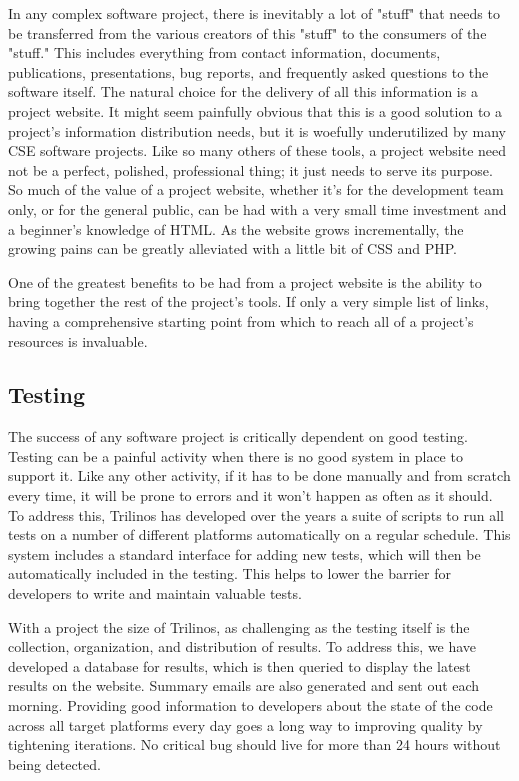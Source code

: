 \documentclass[12pt,relax]{article}
\begin{document}

In any complex software project, there is inevitably a lot of "stuff" that
needs to be transferred from the various creators of this "stuff" to the
consumers of the "stuff."  This includes everything from contact information,
documents, publications, presentations, bug reports, and frequently asked
questions to the software itself.  The natural choice for the delivery of all
this information is a project website.  It might seem painfully obvious that
this is a good solution to a project's information distribution needs, but it
is woefully underutilized by many CSE software projects.  Like so many others
of these tools, a project website need not be a perfect, polished, professional
thing; it just needs to serve its purpose.  So much of the value of a project
website, whether it's for the development team only, or for the general
public, can be had with a very small time investment and a beginner's
knowledge of HTML.  As the website grows incrementally, the growing pains can
be greatly alleviated with a little bit of CSS and PHP.

One of the greatest benefits to be had from a project website is the ability to
bring together the rest of the project's tools.  If only a very simple list of
links, having a comprehensive starting point from which to reach all of a
project's resources is invaluable.

\subsection{Testing}


The success of any software project is critically dependent on good testing.
Testing can be a painful activity when there is no good system in place to
support it.  Like any other activity, if it has to be done manually and from
scratch every time, it will be prone to errors and it won't happen as often as
it should.  To address this, Trilinos has developed over the years a suite of
scripts to run all tests on a number of different platforms automatically on a
regular schedule.  This system includes a standard interface for adding new
tests, which will then be automatically included in the testing.  This helps
to lower the barrier for developers to write and maintain valuable tests.

With a project the size of Trilinos, as challenging as the testing itself is
the collection, organization, and distribution of results.  To address this,
we have developed a database for results, which is then queried to display the
latest results on the website.  Summary emails are also generated and sent out
each morning.  Providing good information to developers about the state of the
code across all target platforms every day goes a long way to improving
quality by tightening iterations.  No critical bug should live for more
than 24 hours without being detected.
\end{document}
